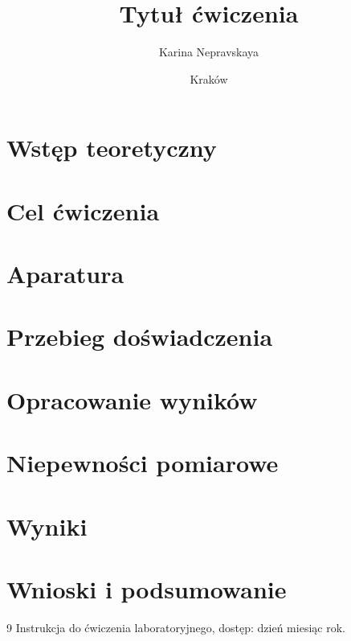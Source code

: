 \documentclass[12pt,a4paper]{article}
\title{\textbf{Tytuł ćwiczenia}}
\author{Karina Nepravskaya}
\date{Kraków \the\year}
\begin{document}
\maketitle

\begin{abstract}
\noindent
\end{abstract}


\section{Wstęp teoretyczny}

\section{Cel ćwiczenia}

\section{Aparatura}

\section{Przebieg doświadczenia}

\section{Opracowanie wyników}

\section{Niepewności pomiarowe}

\section{Wyniki}

\section{Wnioski i podsumowanie}

\begin{thebibliography}{9}
Instrukcja do ćwiczenia laboratoryjnego, dostęp: dzień miesiąc rok.
\end{thebibliography}
\end{document}

